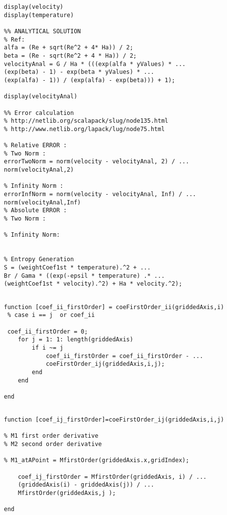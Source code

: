 \begin{lstlisting}
display(velocity)
display(temperature)

%% ANALYTICAL SOLUTION 
% Ref: 
alfa = (Re + sqrt(Re^2 + 4* Ha)) / 2;
beta = (Re - sqrt(Re^2 + 4 * Ha)) / 2;
velocityAnal = G / Ha * (((exp(alfa * yValues) * ...
(exp(beta) - 1) - exp(beta * yValues) * ...
(exp(alfa) - 1)) / (exp(alfa) - exp(beta))) + 1);

display(velocityAnal)

%% Error calculation
% http://netlib.org/scalapack/slug/node135.html
% http://www.netlib.org/lapack/lug/node75.html

% Relative ERROR :
% Two Norm : 
errorTwoNorm = norm(velocity - velocityAnal, 2) / ...
norm(velocityAnal,2)

% Infinity Norm : 
errorInfNorm = norm(velocity - velocityAnal, Inf) / ...
norm(velocityAnal,Inf)
% Absolute ERROR : 
% Two Norm :

% Infinity Norm: 


% Entropy Generation
S = (weightCoef1st * temperature).^2 + ...
Br / Gama * ((exp(-epsil * temperature) .* ...
(weightCoef1st * velocity).^2) + Ha * velocity.^2);

\end{lstlisting}

\begin{lstlisting}

function [coef_ii_firstOrder] = coeFirstOrder_ii(griddedAxis,i)
 % case i == j  or coef_ii 
   
 coef_ii_firstOrder = 0;
    for j = 1: 1: length(griddedAxis)
        if i ~= j
            coef_ii_firstOrder = coef_ii_firstOrder - ...
            coeFirstOrder_ij(griddedAxis,i,j);
        end
    end
    
end

\end{lstlisting}

\begin{lstlisting}

function [coef_ij_firstOrder]=coeFirstOrder_ij(griddedAxis,i,j)

% M1 first order derivative 
% M2 second order derivative

% M1_atAPoint = MfirstOrder(griddedAxis.x,gridIndex);

    coef_ij_firstOrder = MfirstOrder(griddedAxis, i) / ...
    (griddedAxis(i) - griddedAxis(j)) / ...
    MfirstOrder(griddedAxis,j );

end

\end{lstlisting}

